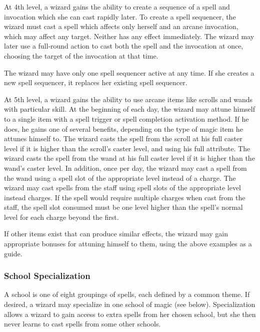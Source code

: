  At 4th level, a wizard gains the ability to create a sequence of a spell and invocation which she can cast rapidly later. To create a spell sequencer, the wizard must cast a spell which affects only herself and an arcane invocation, which may affect any target. Neither has any effect immediately. The wizard may later use a full-round action to cast both the spell and the invocation at once, choosing the target of the invocation at that time.
\par The wizard may have only one spell sequencer active at any time. If she creates a new spell sequencer, it replaces her existing spell sequencer.

 At 5th level, a wizard gains the ability to use arcane items like scrolls and wands with particular skill. At the beginning of each day, the wizard may attune himself to a single item with a spell trigger or spell completion activation method. If he does, he gains one of several benefits, depending on the type of magic item he attunes himself to.
 The wizard casts the spell from the scroll at his full caster level if it is higher than the scroll's caster level, and using his full attribute.
 The wizard casts the spell from the wand at his full caster level if it is higher than the wand's caster level. In addition, once per day, the wizard may cast a spell from the wand using a spell slot of the appropriate level instead of a charge.
 The wizard may cast spells from the staff using spell slots of the appropriate level instead charges. If the spell would require multiple charges when cast from the staff, the spell slot consumed must be one level higher than the spell's normal level for each charge beyond the first.
\par If other items exist that can produce similar effects, the wizard may gain appropriate bonuses for attuning himself to them, using the above examples as a guide.

 \subsubsection{School Specialization}
A school is one of eight groupings of spells, each defined by a common theme. If desired, a wizard may specialize in one school of magic (see below). Specialization allows a wizard to gain access to extra spells from her chosen school, but she then never learns to cast spells from some other schools.

